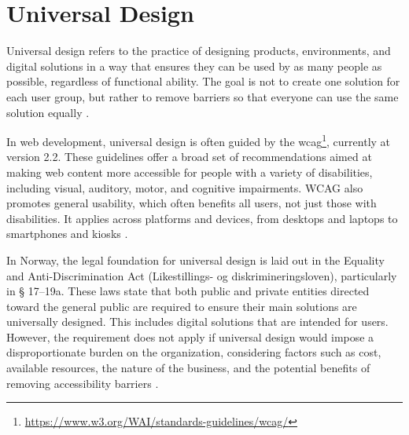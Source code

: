 \section{Universal Design}

Universal design refers to the practice of designing products, environments, and digital solutions in a way that ensures they can be used by as many people as possible, regardless of functional ability. The goal is not to create one solution for each user group, but rather to remove barriers so that everyone can use the same solution equally \cite{uutilsynet}.

In web development, universal design is often guided by the \acrfull{wcag}\footnote{\url{https://www.w3.org/WAI/standards-guidelines/wcag/}}, currently at version 2.2. These guidelines offer a broad set of recommendations aimed at making web content more accessible for people with a variety of disabilities, including visual, auditory, motor, and cognitive impairments. WCAG also promotes general usability, which often benefits all users, not just those with disabilities. It applies across platforms and devices, from desktops and laptops to smartphones and kiosks \cite{wcag}.

In Norway, the legal foundation for universal design is laid out in the Equality and Anti-Discrimination Act (Likestillings- og diskrimineringsloven), particularly in § 17–19a. These laws state that both public and private entities directed toward the general public are required to ensure their main solutions are universally designed. This includes digital solutions that are intended for users. However, the requirement does not apply if universal design would impose a disproportionate burden on the organization, considering factors such as cost, available resources, the nature of the business, and the potential benefits of removing accessibility barriers \cite{lovdata}.

